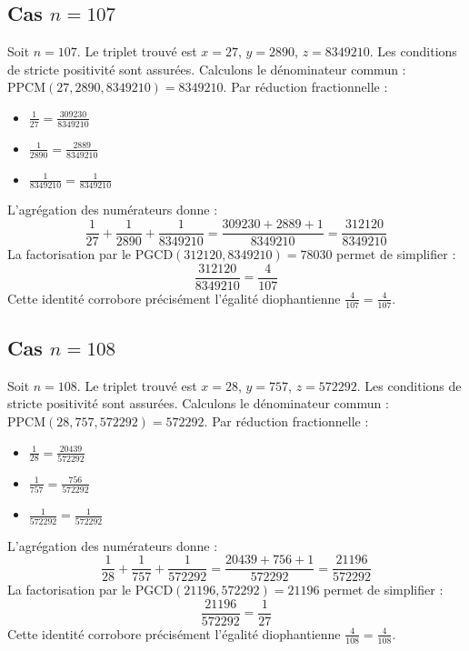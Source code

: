 \documentclass[11pt,a4paper]{article}
\begin{document}
\subsection{Cas $n = 107$}
Soit $n = 107$. Le triplet trouvé est $x = 27$, $y = 2890$, $z = 8349210$.
Les conditions de stricte positivité sont assurées.
Calculons le dénominateur commun : $\text{PPCM}(27, 2890, 8349210) = 8349210$.
Par réduction fractionnelle :
\begin{itemize}
    \item $\frac{1}{27} = \frac{309230}{8349210}$
    \item $\frac{1}{2890} = \frac{2889}{8349210}$
    \item $\frac{1}{8349210} = \frac{1}{8349210}$
\end{itemize}
L'agrégation des numérateurs donne :
$$ \frac{1}{27} + \frac{1}{2890} + \frac{1}{8349210} = \frac{309230 + 2889 + 1}{8349210} = \frac{312120}{8349210} $$
La factorisation par le $\text{PGCD}(312120, 8349210) = 78030$ permet de simplifier :
$$ \frac{312120}{8349210} = \frac{4}{107} $$
Cette identité corrobore précisément l'égalité diophantienne $\frac{4}{107} = \frac{4}{107}$.

\subsection{Cas $n = 108$}
Soit $n = 108$. Le triplet trouvé est $x = 28$, $y = 757$, $z = 572292$.
Les conditions de stricte positivité sont assurées.
Calculons le dénominateur commun : $\text{PPCM}(28, 757, 572292) = 572292$.
Par réduction fractionnelle :
\begin{itemize}
    \item $\frac{1}{28} = \frac{20439}{572292}$
    \item $\frac{1}{757} = \frac{756}{572292}$
    \item $\frac{1}{572292} = \frac{1}{572292}$
\end{itemize}
L'agrégation des numérateurs donne :
$$ \frac{1}{28} + \frac{1}{757} + \frac{1}{572292} = \frac{20439 + 756 + 1}{572292} = \frac{21196}{572292} $$
La factorisation par le $\text{PGCD}(21196, 572292) = 21196$ permet de simplifier :
$$ \frac{21196}{572292} = \frac{1}{27} $$
Cette identité corrobore précisément l'égalité diophantienne $\frac{4}{108} = \frac{4}{108}$.
\end{document}
